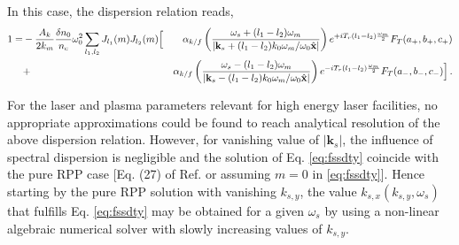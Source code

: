 \documentclass[
 reprint,
 amsmath,amssymb,
 aps,
]{revtex4-1}
\begin{document}
\begin{widetext}
In this case, the dispersion relation reads,
\begin{align}
   1 =& - \frac{A_k}{2k_m}  \frac{\delta n_0}{n_c}\omega_0^2
    \sum_{l_1, l_2} 
     J_{l_1}(m)J_{l_2}(m) 
      \Big[&
       \alpha_{k/f}\left(\frac{\omega_s+(l_1-l_2)\omega_m}
  {\vert\mathbf{k}_s+(l_1-l_2)k_0\omega_m/\omega_0\Hat{\mathbf{x}} \vert}
  \right) 
      e^{ + iT_{r} (l_1-l_2)\frac{ \omega_m}{2} }  F_T(a_+,b_+,c_+)
     \nonumber \\&
      + &\alpha_{k/f}\left(\frac{\omega_s-(l_1-l_2)\omega_m}
  {\vert\mathbf{k}_s-(l_1-l_2)k_0\omega_m/\omega_0\Hat{\mathbf{x}} \vert}
  \right) 
      e^{ - iT_{r} (l_1-l_2)\frac{ \omega_m}{2} }   F_T(a_-,b_-,c_-)
    \Big]
   \, .\label{eq:fssdty}
\end{align}
   
For the laser and plasma parameters relevant for high energy laser facilities, no appropriate  approximations could be found to reach analytical resolution of the above dispersion relation. However, for vanishing value of $\vert \mathbf{k}_s \vert $, the influence of spectral dispersion is negligible  and the solution of Eq. \eqref{eq:fssdty} coincide with the pure RPP case [Eq. (27) of Ref. \cite[]{Ruyer_FSBS} or assuming $m=0$ in \eqref{eq:fssdty}]. Hence starting by   the pure RPP solution with vanishing ${k}_{s,y}$, the value $k_{s,x}({k}_{s,y}, \omega_s) $ that fulfills Eq. \eqref{eq:fssdty}  may be obtained for a given $\omega_s$ by using a non-linear algebraic numerical solver  with slowly increasing values of $k_{s,y}$.


\end{widetext}
\end{document}

